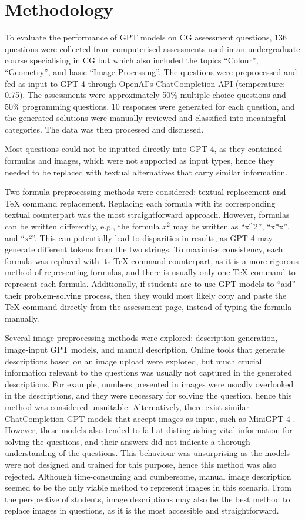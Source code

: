 \documentclass[sigconf,review]{acmart}
\begin{document}
\section{Methodology}
To evaluate the performance of GPT models on CG assessment questions, 136 questions were collected from computerised assessments used in an undergraduate course specialising in CG but which also included the topics ``Colour'', ``Geometry'', and basic ``Image Processing''. The questions were preprocessed and fed as input to GPT-4 through OpenAI's ChatCompletion API (temperature: 0.75). The assessments were approximately 50\% multiple-choice questions and 50\% programming questions. 10 responses were generated for each question, and the generated solutions were manually reviewed and classified into meaningful categories. The data was then processed and discussed.

Most questions could not be inputted directly into GPT-4, as they contained formulas and images, which were not supported as input types, hence they needed to be replaced with textual alternatives that carry similar information.

Two formula preprocessing methods were considered: textual replacement and TeX command replacement. Replacing each formula with its corresponding textual counterpart was the most straightforward approach. However, formulas can be written differently, e.g., the formula $x^2$ may be written as ``x\^{}2'', ``x*x'', and ``x²''. This can potentially lead to disparities in results, as GPT-4 may generate different tokens from the two strings. To maximise consistency, each formula was replaced with its TeX command counterpart, as it is a more rigorous method of representing formulas, and there is usually only one TeX command to represent each formula. Additionally, if students are to use GPT models to ``aid'' their problem-solving process, then they would most likely copy and paste the TeX command directly from the assessment page, instead of typing the formula manually.

Several image preprocessing methods were explored: description generation, image-input GPT models, and manual description. Online tools that generate descriptions based on an image upload were explored, but much crucial information relevant to the questions was usually not captured in the generated descriptions. For example, numbers presented in images were usually overlooked in the descriptions, and they were necessary for solving the question, hence this method was considered unsuitable. Alternatively, there exist similar ChatCompletion GPT models that accept images as input, such as MiniGPT-4 \cite{mini}. However, these models also tended to fail at distinguishing vital information for solving the questions, and their answers did not indicate a thorough understanding of the questions. This behaviour was unsurprising as the models were not designed and trained for this purpose, hence this method was also rejected. Although time-consuming and cumbersome, manual image description seemed to be the only viable method to represent images in this scenario. From the perspective of students, image descriptions may also be the best method to replace images in questions, as it is the most accessible and straightforward.
\end{document}
